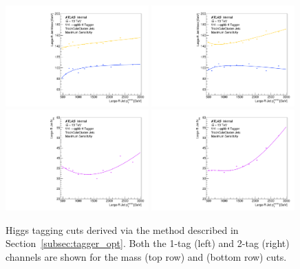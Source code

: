 \begin{figure}[htbp!]
\begin{center}
    \includegraphics[width=0.49\textwidth]{VHqqbbOptimizedBosonTagger_H_mass_1tag.pdf}
    \includegraphics[width=0.49\textwidth]{VHqqbbOptimizedBosonTagger_H_mass_2tag.pdf} \\
    \includegraphics[width=0.49\textwidth]{VHqqbbOptimizedBosonTagger_H_ntrk_1tag.pdf}
    \includegraphics[width=0.49\textwidth]{VHqqbbOptimizedBosonTagger_H_ntrk_2tag.pdf}
\end{center}
\caption{Higgs tagging cuts derived via the method described in Section~\ref{subsec:tagger_opt}. Both the 1-tag (left) and 2-tag (right) channels are shown for the mass (top row) and \ntrk (bottom row) cuts.}
\label{fig:higgs_tagger_cuts}
\end{figure}

